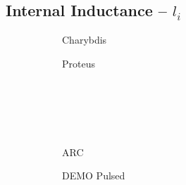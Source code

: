 \clearpage

\newpage

\subsection*{ Internal Inductance -- $l_i$ }
  \label{subsection:sensitivity_l_i}

\begin{figure*}[h!]
    \centering
    \hfill
    \begin{subfigure}[t]{0.45\textwidth}
        \centering
    \begin{adjustbox}{width=\textwidth}
      \Large
      
    \end{adjustbox}
        \caption{Charybdis}
    \end{subfigure}
    \hfill
    \begin{subfigure}[t]{0.45\textwidth}
        \centering
    \begin{adjustbox}{width=\textwidth}
      \Large
      
    \end{adjustbox}
        \caption{Proteus}
    \end{subfigure}
    \hfill \hfill ~\\ ~\\ ~\\ ~\\
    \hfill
    \begin{subfigure}[t]{0.45\textwidth}
        \centering
    \begin{adjustbox}{width=\textwidth}
      \Large
      
    \end{adjustbox}
        \caption{ARC}
    \end{subfigure}
    \hfill
    \begin{subfigure}[t]{0.45\textwidth}
        \centering
    \begin{adjustbox}{width=\textwidth}
      \Large
      
    \end{adjustbox}
        \caption{DEMO Pulsed}
    \end{subfigure}
    \hfill \hfill ~\\ ~\\ ~\\ ~\\
    \hfill
    \begin{subfigure}[t]{0.45\textwidth}
        \centering
    \begin{adjustbox}{width=\textwidth}

\end{adjustbox}
\end{subfigure}
\end{figure*}
